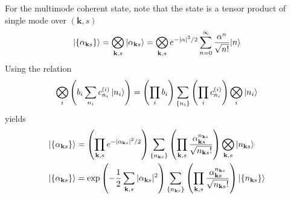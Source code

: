 \documentclass[../../../main.tex]{subfiles}
\begin{document}
For the multimode coherent state, note that the state is a tensor product of single mode over $(\mathbf{k},s)$
\begin{equation*}
  \ket{\left\{ \alpha_{\mathbf{k }s} \right\} } = \bigotimes_{\mathbf{k},s} \ket{\alpha_{\mathbf{k }s}}=
  \bigotimes_{\mathbf{k },s} e^{-|\alpha|^2/2} \sum_{n=0}^{\infty} \frac{\alpha^n}{\sqrt{n!}} |n\rangle
\end{equation*}
Using the relation
\begin{equation*}
  \bigotimes_i \left(b_i \sum_{n_i } c_{n_i }^{(i )}\ket{n_i}  \right)
  =
  \left( \prod_i b_i \right) \sum_{\left\{ n_i  \right\} }\left( \prod_i  c_{n_i} ^{(i)}\right)  \bigotimes_i \ket{n_i}
\end{equation*}
yields
\begin{align*}
  \ket{\left\{ \alpha_{\mathbf{k }s} \right\} }
   & =
  \left( \prod_{\mathbf{k},s} e^{-|\alpha_{\mathbf{k }s}|^2/2} \right) \sum_{\{n_{\mathbf{k }s}\}} \left( \prod_{\mathbf{k},s} \frac{\alpha_{\mathbf{k }s}^{n_{\mathbf{k }s}}}{\sqrt{n_{\mathbf{k }s}!}} \right) \bigotimes_{\mathbf{k },s}|n_{\mathbf{k }s}\rangle \\
  | \{ \alpha_{\mathbf{k }s} \} \rangle
   & =
  \exp\left(-\frac{1}{2} \sum_{\mathbf{k},s} |\alpha_{\mathbf{k }s}|^2\right) \sum_{\{ n_{\mathbf{k }s} \}} \left( \prod_{\mathbf{k},s} \frac{\alpha_{\mathbf{k }s}^{n_{\mathbf{k }s}}}{\sqrt{n_{\mathbf{k }s}!}} \right) \ket{\{ n_{\mathbf{k }s} \}}
\end{align*}
\end{document}
